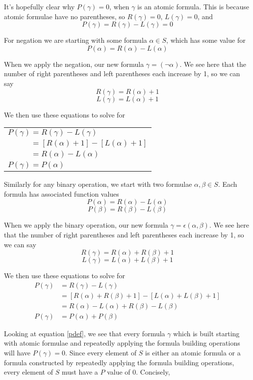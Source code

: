 \documentclass[12pt]{article}
\begin{document}
It's hopefully clear why $P(\gamma)=0$, when $\gamma$ is an atomic formula. This is because atomic formulae have no parentheses, so $R(\gamma)=0$, $L(\gamma)=0$, and
\[P(\gamma) = R(\gamma) - L(\gamma) = 0\]

For negation we are starting with some formula $\alpha \in S$, which has some value for 
\[P(\alpha)=R(\alpha)-L(\alpha)\]

When we apply the negation, our new formula $\gamma = (\lnot \alpha)$. We see here that the number of right parentheses and left parentheses each increase by 1, so we can say
\[R(\gamma) = R(\alpha) + 1\]
\[L(\gamma) = L(\alpha) + 1\]

We then use these equations to solve for

\renewcommand{\arraystretch}{1.5}
\begin{center}
   \begin{tabular}{l}
        $P(\gamma) = R(\gamma) - L(\gamma)$\\
        $\phantom{P(\gamma)} = [R(\alpha) + 1] - [L(\alpha) + 1]$\\
        $\phantom{P(\gamma)} = R(\alpha) - L(\alpha)$\\
        $P(\gamma) = P(\alpha)$
    \end{tabular} 
\end{center}

Similarly for any binary operation, we start with two formulae $\alpha, \beta \in S$. Each formula has associated function values 
\[P(\alpha)=R(\alpha)-L(\alpha)\]
\[P(\beta)=R(\beta)-L(\beta)\]

When we apply the binary operation, our new formula $\gamma = \epsilon(\alpha, \beta)$. We see here that the number of right parentheses and left parentheses each increase by 1, so we can say
\[R(\gamma) = R(\alpha) + R(\beta) + 1\]
\[L(\gamma) = L(\alpha) + L(\beta) + 1\]

We then use these equations to solve for
\begin{align*}
    P(\gamma)   &= R(\gamma) - L(\gamma)\\
                &= [R(\alpha) + R(\beta) + 1] - [L(\alpha) + L(\beta) + 1]\\
                &= R(\alpha) - L(\alpha) + R(\beta)-L(\beta)\\
    P(\gamma)   &= P(\alpha) + P(\beta)
\end{align*}

Looking at equation \ref{pdef}, we see that every formula $\gamma$ which is built starting with atomic formulae and repeatedly applying the formula building operations will have $P(\gamma)=0$. Since every element of $S$ is either an atomic formula or a formula constructed by repeatedly applying the formula building operations, every element of $S$ must have a $P$ value of 0. Concisely,
\end{document}
